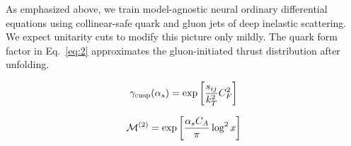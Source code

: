 As emphasized above, we train model-agnostic neural ordinary
differential equations using collinear-safe quark and gluon jets of deep
inelastic scattering. We expect unitarity cuts to modify this picture
only mildly. The quark form factor in Eq.~\eqref{eq:2} approximates the
gluon-initiated thrust distribution after unfolding.

\begin{equation}
  \gamma_{\rm cusp}(\alpha_s) = \exp\left[\frac{s_{ij}}{k_T^2} C_F^2\right]
  \label{eq:4}
\end{equation}

\begin{equation}
  \mathcal{M}^{(2)} = \exp\left[\frac{\alpha_s C_A}{\pi} \log^2 x\right]
  \label{eq:6}
\end{equation}

